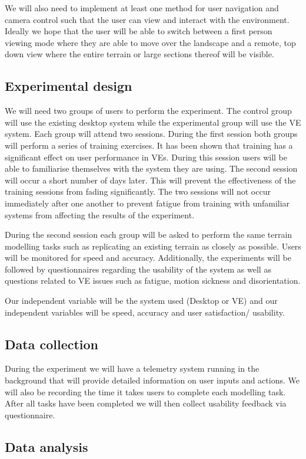 \documentclass{sig-alternate-05-2015}
\begin{document}
We will also need to implement at least one method for user navigation and camera control such that the user can view and interact with the environment. Ideally we hope that the user will be able to switch between a first person viewing mode where they are able to move over the landscape and a remote, top down view where the entire terrain or large sections thereof will be visible.

\subsection{Experimental design}
We will need two groups of users to perform the experiment. The control group will use the existing desktop system while the experimental group will use the VE system. Each group will attend two sessions. During the first session both groups will perform a series of training exercises. It has been shown that training has a significant effect on user performance in VEs\cite{Schultheis2012}. During this session users will be able to familiarise themselves with the system they are using. The second session will occur a short number of days later. This will prevent the effectiveness of the training sessions from fading significantly. The two sessions will not occur immediately after one another to prevent fatigue from training with unfamiliar systems from affecting the results of the experiment.

During the second session each group will be asked to perform the same terrain modelling tasks such as replicating an existing terrain as closely as possible. Users will be monitored for speed and accuracy. Additionally, the experiments will be followed by questionnaires regarding the usability of the system as well as questions related to VE issues such as fatigue, motion sickness and disorientation.

Our independent variable will be the system used (Desktop or VE) and our independent variables will be speed, accuracy and user satisfaction/ usability.
\subsection{Data collection}
During the experiment we will have a telemetry system running in the background that will provide detailed information on user inputs and actions. We will also be recording the time it takes users to complete each modelling task. After all tasks have been completed we will then collect usability feedback via questionnaire. 
\subsection{Data analysis}
\end{document}

